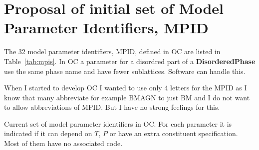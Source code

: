\documentclass{article}
\begin{document}
\begin{appendices}
{\begin{verbatim}
\end{verbatim}
}

\newpage 

\setcounter{equation}{0}
\renewcommand{\theequation}{C\arabic{equation}}
\setcounter{figure}{0}
\renewcommand{\thefigure}{C\arabic{figure}}

\section{Proposal of initial set of Model Parameter Identifiers, MPID}\label{sec:mpid2}

The 32 model parameter identifiers, MPID, defined in OC are listed in
Table~\ref{tab:mpis}.  In OC a parameter for a disordred part of a
{\bf DisorderedPhase} use the same phase name and have fewer
sublattices.  Software can handle this.

When I started to develop OC I wanted to use only 4 letters for the
MPID as I know that many abbreviate for example BMAGN to just BM and I
do not want to allow abbreviations of MPID.  But I have no strong
feelings for this.

\begin{table}[!h]
  \caption{Current set of model parameter identifiers in OC.  For each
    parameter it is indicated if it can depend on $T$, $P$ or have an
    extra constituent specification.  Most of them have no associated
    code.}\label{tab:mpis}


\end{table}
\end{appendices}
\end{document}
